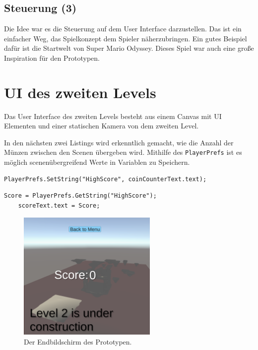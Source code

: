 \subsection{Steuerung (3)}
Die Idee war es die Steuerung auf dem User Interface darzustellen. Das ist ein einfacher Weg, das Spielkonzept dem Spieler näherzubringen. Ein gutes Beispiel dafür ist die Startwelt von Super Mario Odyssey. Dieses Spiel war auch eine große Inspiration für den Prototypen. 

\section{UI des zweiten Levels}
Das User Interface des zweiten Levels besteht aus einem Canvas mit UI Elementen und einer statischen Kamera von dem zweiten Level. 

In den nächsten zwei Listings wird erkenntlich gemacht, wie die Anzahl der Münzen zwischen den Scenen übergeben wird. Mithilfe des \verb+PlayerPrefs+ ist es möglich scenenübergreifend Werte in Variablen zu Speichern. 
\begin{lstlisting}[language=CSharp,caption={Portal Klasse.},label=code:portal]
    PlayerPrefs.SetString("HighScore", coinCounterText.text);
\end{lstlisting}

\begin{lstlisting}[language=CSharp,caption={GameManager Klasse.},label=code:gamemanager]
    Score = PlayerPrefs.GetString("HighScore");
    scoreText.text = Score;
\end{lstlisting}


\begin{figure}[h]
    \centering
    \includegraphics[width=0.6\textwidth]{chapters/04/images/V3/Level2Game.png}
    \caption{Der Endbildschirm des Prototypen.}
    \label{fig:UI20}
\end{figure}